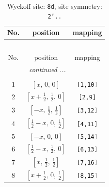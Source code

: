 \documentclass[fleqn,8pt]{jsarticle}
\begin{document}
\begin{longtable}{ccc}
\caption{Wyckoff site: {\tt 8d}, site symmetry: {\tt 2'..}}
 \\
 \hline \hline
No. & position & mapping \\ \hline \endfirsthead

\multicolumn{2}{l}{\tablename\ \thetable{}} \\
 \hline \hline
No. & position & mapping \\ \hline \endhead

 \hline \hline
\multicolumn{2}{r}{\footnotesize\it continued ...} \\ \endfoot

 \hline \hline
\multicolumn{2}{r}{} \\ \endlastfoot

1 & $\left[ x,\, 0,\, 0 \right]$ & {\tt [1,10]} \\ \hline
2 & $\left[ x + \frac{1}{2},\, \frac{1}{2},\, 0 \right]$ & {\tt [2,9]} \\ \hline
3 & $\left[ - x,\, \frac{1}{2},\, \frac{1}{2} \right]$ & {\tt [3,12]} \\ \hline
4 & $\left[ \frac{1}{2} - x,\, 0,\, \frac{1}{2} \right]$ & {\tt [4,11]} \\ \hline
5 & $\left[ - x,\, 0,\, 0 \right]$ & {\tt [5,14]} \\ \hline
6 & $\left[ \frac{1}{2} - x,\, \frac{1}{2},\, 0 \right]$ & {\tt [6,13]} \\ \hline
7 & $\left[ x,\, \frac{1}{2},\, \frac{1}{2} \right]$ & {\tt [7,16]} \\ \hline
8 & $\left[ x + \frac{1}{2},\, 0,\, \frac{1}{2} \right]$ & {\tt [8,15]} \\
\end{longtable}
\renewcommand{\arraystretch}{1.2}
\end{document}
